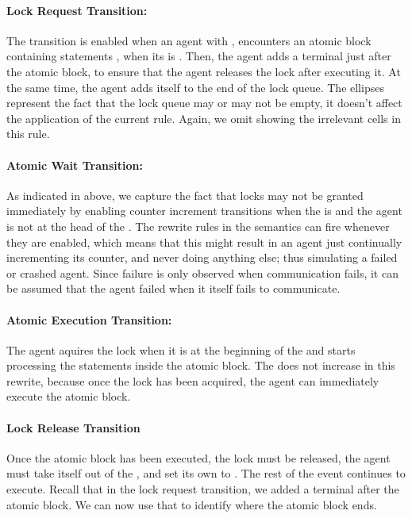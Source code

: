 \paragraph{Lock Request Transition:} The  transition is enabled when an agent with  , encounters an atomic block containing statements , when its  is . Then, the agent adds a terminal  just after the atomic block, to ensure that the agent releases the lock after executing it. At the same time, the agent adds itself to the end of the lock queue. The ellipses represent the fact that the lock queue may or may not be empty, it doesn't affect the application of the current rule. Again, we omit showing the irrelevant cells in this rule. 

\paragraph{Atomic Wait Transition:} As indicated in above, we capture the fact that locks may not be granted immediately by enabling counter increment transitions when the  is  and the agent  is not at the head of the . The rewrite rules in the semantics can fire whenever they are enabled, which means that this might result in an agent just continually incrementing its counter, and never doing anything else; thus simulating a failed or crashed agent. Since failure is only observed when communication fails, it can be assumed that the agent failed when it itself fails to communicate. 

\paragraph{Atomic Execution Transition:} The agent aquires the lock when it is at the beginning of the  and starts processing the statements inside the atomic block. The  does not increase in this rewrite, because once the lock has been acquired, the agent can immediately execute the atomic block. 

\paragraph{Lock Release Transition}
Once the atomic block has been executed, the lock must be released, the agent must take itself out of the , and set its own  to . The rest of the event continues to execute. Recall that in the lock request transition, we added a terminal  after the atomic block. We can now use that to identify where the atomic block ends. 

